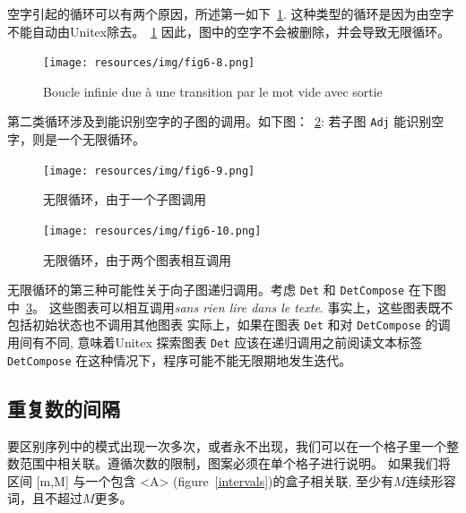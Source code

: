 \bigskip
\noindent 
空字引起的循环可以有两个原因，所述第一如下~\ref{fig-epsilon-output-loop}.
这种类型的循环是因为由空字不能自动由Unitex除去。~\ref{fig-epsilon-output-loop} 因此，图中的空字不会被删除，并会导致无限循环。

\bigskip
\begin{figure}[!h]
\begin{center}
\texttt{[image: resources/img/fig6-8.png]}
\caption{Boucle infinie due à une transition par le mot vide avec sortie\label{fig-epsilon-output-loop}}
\end{center}
\end{figure}

\bigskip
\noindent 第二类循环涉及到能识别空字的子图的调用。如下图：~\ref{fig-epsilon-subgraph-loop}: 若子图 \verb+Adj+ 能识别空字，则是一个无限循环。

\bigskip
\begin{figure}[!ht]
\begin{center}
\texttt{[image: resources/img/fig6-9.png]}
\caption{无限循环，由于一个子图调用
\label{fig-epsilon-subgraph-loop}}
\end{center}
\end{figure}

\begin{figure}[!ht]
\begin{center}
\texttt{[image: resources/img/fig6-10.png]}
\caption{无限循环，由于两个图表相互调用
\label{fig-recursive-calls-loop}}
\end{center}
\end{figure}

\noindent 无限循环的第三种可能性关于向子图递归调用。考虑 \verb+Det+ 和 \verb+DetCompose+ 在下图中~\ref{fig-recursive-calls-loop}。
这些图表可以相互调用\textit{sans rien lire dans le texte}. 事实上，这些图表既不包括初始状态也不调用其他图表 实际上，如果在图表 \verb+Det+ 和对 \verb+DetCompose+ 的调用间有不同, 意味着Unitex
 探索图表 \verb+Det+ 应该在递归调用之前阅读文本标签 \verb+DetCompose+ 在这种情况下，程序可能不能无限期地发生迭代。

\pagebreak
\subsection{重复数的间隔}
\label{nb-repetitions}
\noindent 
要区别序列中的模式出现一次多次，或者永不出现，我们可以在一个格子里一个整数范围中相关联。遵循次数的限制，图案必须在单个格子进行说明。
如果我们将区间 [m,M] 与一个包含 <A> (figure~\ref{intervals})的盒子相关联, 至少有$ M$连续形容词，且不超过$ M$更多。

